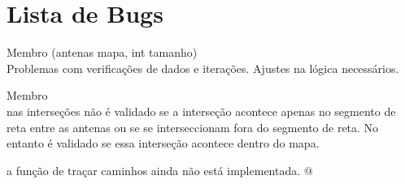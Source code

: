 \chapter{Lista de Bugs}
\hypertarget{bug}{}\label{bug}

\begin{DoxyRefList}
\item[Membro \doxylink{source_8c_a75b49b961c1106519a649c5c6959b651}{intersecao} (antenas mapa, int tamanho)]\hfill \\
\label{bug__bug000002}%
%
Problemas com verificações de dados e iterações. Ajustes na lógica necessários.  
\item[Membro \doxylink{source_8c_a8d23feea868a983c8c2b661e1e16972f}{RED} ]\hfill \\
\label{bug__bug000001}%
%
nas interseções não é validado se a interseção acontece apenas no segmento de reta entre as antenas ou se se interseccionam fora do segmento de reta. No entanto é validado se essa interseção acontece dentro do mapa. 



a função de traçar caminhos ainda não está implementada. @ 
\end{DoxyRefList}